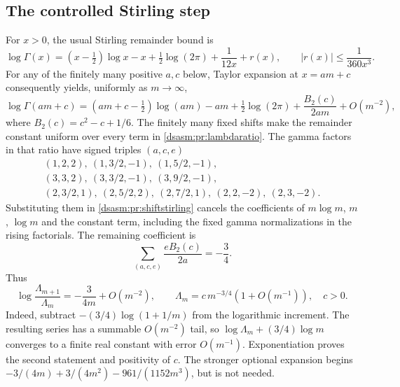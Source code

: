\documentclass[11pt,letterpaper]{article}
\theoremstyle{remark}\newtheorem{remark}[theorem]{Remark}
\begin{document}
\subsection{The controlled Stirling step}
For $x>0$, the usual Stirling remainder bound is
\[
 \log\Gamma(x)=(x-\tfrac12)\log x-x+\tfrac12\log(2\pi)
                 +\frac1{12x}+r(x),\qquad |r(x)|\le\frac1{360x^3}.
\]
For any of the finitely many positive $a,c$ below, Taylor expansion
at $x=am+c$ consequently yields, uniformly as $m\to\infty$,
\begin{equation}\label{dsasm:pr:shiftstirling}
 \log\Gamma(am+c)=(am+c-\tfrac12)\log(am)-am
  +\tfrac12\log(2\pi)+\frac{B_2(c)}{2am}+O(m^{-2}),
\end{equation}
where $B_2(c)=c^2-c+1/6$. The finitely many fixed shifts make the
remainder constant uniform over every term in \eqref{dsasm:pr:lambdaratio}.
The gamma factors in that ratio have signed triples $(a,c,e)$
\[
\begin{gathered}
(1,2,2),\ (1,3/2,-1),\ (1,5/2,-1),\\
(3,3,2),\ (3,3/2,-1),\ (3,9/2,-1),\\
(2,3/2,1),\ (2,5/2,2),\ (2,7/2,1),\ (2,2,-2),\ (2,3,-2).
\end{gathered}
\]
Substituting them in \eqref{dsasm:pr:shiftstirling} cancels the coefficients
of $m\log m$, $m$, $\log m$ and the constant term, including the
fixed gamma normalizations in the rising factorials. The remaining
coefficient is
\[
 \sum_{(a,c,e)}\frac{eB_2(c)}{2a}=-\frac34.
\]
Thus
\begin{equation}\label{dsasm:pr:lambdaasympt}
 \log\frac{\Lambda_{m+1}}{\Lambda_m}
 =-\frac3{4m}+O(m^{-2}),\qquad
 \Lambda_m=c\,m^{-3/4}(1+O(m^{-1})),\quad c>0.
\end{equation}
Indeed, subtract $-(3/4)\log(1+1/m)$ from the logarithmic increment.
The resulting series has a summable $O(m^{-2})$ tail, so
$\log\Lambda_m+(3/4)\log m$ converges to a finite real constant
with error $O(m^{-1})$. Exponentiation proves the second statement
and positivity of $c$. The stronger optional expansion begins
$-3/(4m)+3/(4m^2)-961/(1152m^3)$, but is not needed.
\end{document}
